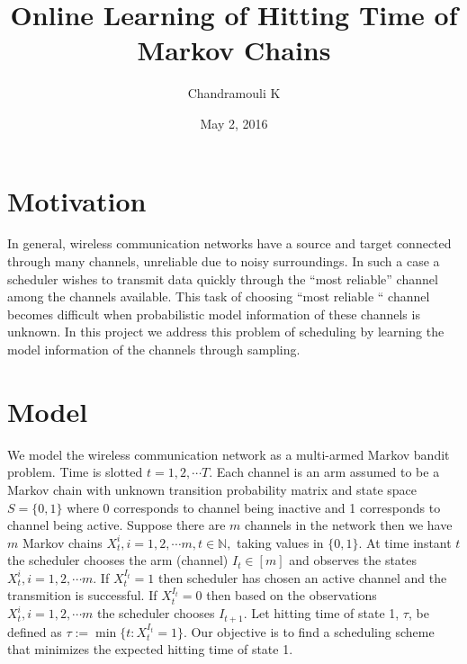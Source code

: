 \documentclass[a4paper,10pt]{article}
\title{Online Learning of Hitting Time of Markov Chains}
\author{Chandramouli K}
\date{May 2, 2016}
\begin{document}
\maketitle
\section*{Motivation}
In general, wireless communication networks have a source and target connected through 
many channels, unreliable due to noisy surroundings. In such a case a scheduler wishes to 
transmit data quickly through the ``most reliable'' channel among the channels available.  
This task of choosing ``most reliable `` channel becomes difficult when probabilistic model 
information of these channels is unknown. In this project we address this problem of 
scheduling by learning the model information of the channels through sampling.
\section*{Model}
We model the wireless communication network as a multi-armed Markov bandit problem. Time is 
slotted $t= 1,2, \cdots T.$ Each channel is an arm assumed to be a Markov chain with unknown 
transition probability matrix and state space $S=\{0,1\}$ where 0 corresponds to channel being
inactive and 1 corresponds to channel being active. Suppose there are $m$ channels in the 
network then we have $m$  Markov chains $X^{i}_{t}, i=1,2, \cdots m, t \in \mathbb{N},$ taking 
values in $\{0,1\}.$ At time instant $t$ the scheduler chooses the arm (channel) 
$I_t \in [m]$ and observes the states $X^{i}_{t}, i=1,2, \cdots m.$ If $X^{I_t}_{t}=1$ then
scheduler has chosen an active channel and the transmition is successful. If $X^{I_t}_{t}=0$ 
then based on the observations $X^{i}_{t}, i=1,2, \cdots m$ the scheduler chooses $I_{t+1}.$
Let hitting time of state 1, $\tau$, be defined as $\tau := \min\{t:X^{I_t}_{t}=1\}.$ Our 
objective is to find a scheduling scheme that minimizes the expected hitting time of state 1.

\end{document}
